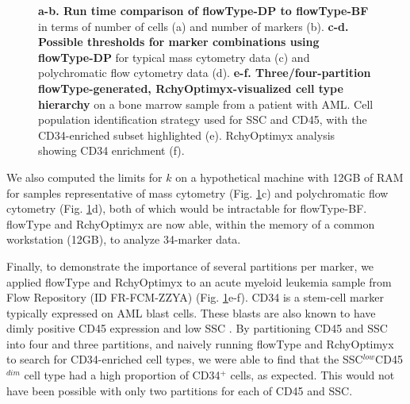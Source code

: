 \begin{figure}[!ht]%
\caption{
\textbf{a-b. Run time comparison of flowType-DP to flowType-BF} in terms of number of cells (a) and number of markers (b). 
\textbf{c-d. Possible thresholds for marker combinations using flowType-DP} for typical mass cytometry data (c) and polychromatic flow cytometry data (d). 
\textbf{e-f. Three/four-partition flowType-generated, RchyOptimyx-visualized cell type hierarchy} on a bone marrow sample from a patient with AML. Cell population identification strategy used for SSC and CD45, with the CD34-enriched subset highlighted (e).
RchyOptimyx analysis showing CD34 enrichment (f). }
\label{fig:01}
\end{figure}

We also computed the limits for $k$ on a hypothetical machine with 12GB of RAM for samples representative of mass cytometry (Fig. \ref{fig:01}c) and polychromatic flow cytometry (Fig. \ref{fig:01}d), both of which would be intractable for flowType-BF.
flowType and RchyOptimyx are now able, within the memory of a common workstation (12GB), to analyze 34-marker data. 

Finally, to demonstrate the importance of several partitions per marker, we applied flowType and RchyOptimyx to an acute myeloid leukemia sample from Flow Repository (ID FR-FCM-ZZYA) (Fig. \ref{fig:01}e-f).
CD34 is a stem-cell marker typically expressed on AML blast cells. These blasts are also known to have dimly positive CD45 expression and low SSC \cite{Vial2001}. 
By partitioning CD45 and SSC into four and three partitions, and naively running flowType and RchyOptimyx to search for CD34-enriched cell types, we were able to find that the SSC$^{low}$CD45$^{dim}$ cell type had a high proportion of CD34$^+$ cells, as expected.
This would not have been possible with only two partitions for each of CD45 and SSC.


